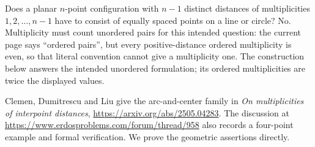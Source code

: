 Does a planar $n$-point configuration with $n-1$ distinct distances of multiplicities $1,2,\ldots,n-1$ have to consist of equally spaced points on a line or circle? No. Multiplicity must count unordered pairs for this intended question: the current page says ``ordered pairs'', but every positive-distance ordered multiplicity is even, so that literal convention cannot give a multiplicity one. The construction below answers the intended unordered formulation; its ordered multiplicities are twice the displayed values.

Clemen, Dumitrescu and Liu give the arc-and-center family in \emph{On multiplicities of interpoint distances}, \url{https://arxiv.org/abs/2505.04283}. The discussion at \url{https://www.erdosproblems.com/forum/thread/958} also records a four-point example and formal verification. We prove the geometric assertions directly.
